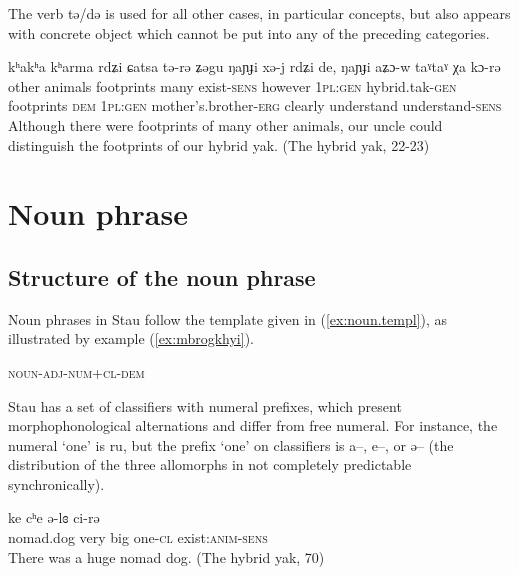 \documentclass[oneside,a4paper,11pt]{article}
\newcommand{\ipa}[1]{{\phon #1}} %
\begin{document}
The verb \ipa{tə/də} is used for all other cases, in particular concepts, but also appears with concrete object which cannot be put into any of the preceding categories.

\begin{exe}
\ex \label{ex:kharma}
\gll
\ipa{kʰakʰa} 	\ipa{kʰarma} 	\ipa{rdʑi} 	\ipa{ɕatsa} 	\ipa{tə-rə} 	\ipa{ʑəgu} \ipa{ŋaɲɟi} 	\ipa{xə-j} 	\ipa{rdʑi} 	\ipa{de,} 	\ipa{ŋaɲɟi} 	\ipa{aʑɔ-w} 	\ipa{taˠtaˠ} 	\ipa{χa} 	\ipa{kɔ-rə} \\
other animals footprints many exist-\textsc{sens} however \textsc{1pl:gen} hybrid.tak-\textsc{gen} footprints \textsc{dem} \textsc{1pl:gen} mother's.brother-\textsc{erg} clearly understand understand-\textsc{sens} \\
\glt Although there were footprints of many other animals, our uncle could distinguish the footprints of our hybrid yak. (The hybrid yak, 22-23)
\end{exe}

 
 \section{Noun phrase}

\subsection{Structure of the noun phrase}
Noun phrases in Stau follow the template given in (\ref{ex:noun.templ}), as illustrated by example (\ref{ex:mbrogkhyi}). 

\begin{exe}
\ex \label{ex:noun.templ}
\glt \textsc{noun-adj-num+cl-dem}
\end{exe}

Stau has a set of classifiers with numeral prefixes, which present morphophonological alternations and differ from free numeral. For instance, the numeral `one' is \ipa{ru}, but the prefix `one' on classifiers is \ipa{a--}, \ipa{e--}, or \ipa{ə--} (the distribution of the three allomorphs in not completely predictable synchronically).

\begin{exe}
\ex \label{ex:mbrogkhyi}
\gll \ipa{mbroˠcʰə} \ipa{ke} \ipa{cʰe} \ipa{ə-lɞ} \ipa{ci-rə} \\
nomad.dog very big one-\textsc{cl} exist:\textsc{anim}-\textsc{sens}\\
\glt There was a huge nomad dog. (The hybrid yak, 70)
\end{exe}
\end{document}
